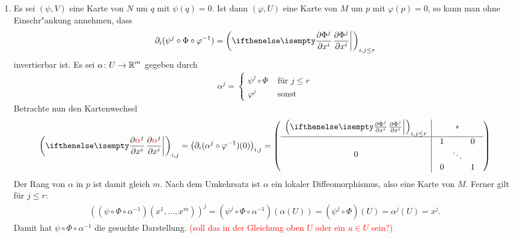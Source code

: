 
\begin{bew} %
\begin{enumerate}[label=(\roman*),widest=ii,leftmargin=*]
  \item
  Es sei $(\psi, V)$ eine Karte von $N$ um $q$ mit $\psi(q) = 0$.
  Ist dann $(\varphi, U)$ eine Karte von $M$ um $p$ mit $\varphi(p) = 0$, so kann man ohne Einschr"ankung annehmen, dass 
  \begin{align*}
    \partial_i(\psi^j \circ \Phi \circ \varphi^{-1}) = \left(\pdifffrac{\Phi^j}{x^i}\right)_{i,j \leq r} 
  \end{align*}
  invertierbar ist.
  Es sei $\alpha \colon U \to \operatorname{\mathbb{R}}^m$ gegeben durch
  \begin{align*}
    \alpha^j =
    \begin{cases}
      \psi^j \circ \Phi & \text{ für } j \leq r\\
      \varphi^j & \text{ sonst}
    \end{cases}
  \end{align*}
  Betrachte nun den Kartenwechsel
  \begin{align*}
    \left(\pdifffrac{\textcolor{red}{\alpha}^j}{x^i}\right)_{i,j} = \left(\partial_i(\alpha^j \circ \varphi^{-1})(0)\right)_{i,j} = \left(
      \begin{array}{c|c}
        \left(\pdifffrac{\Phi^j}{x^i}\right)_{i,j \le r} & \ast\\
        \hline
        0 & 
        \begin{array}{ccc}
          1 &&0\\
          &\ddots&\\
          0&&1
        \end{array}
      \end{array}\right)
  \end{align*}
  Der Rang von $\alpha$ in $p$ ist damit gleich $m$. Nach dem Umkehrsatz ist $\alpha$ ein lokaler Diffeomorphismus, also eine Karte von $M$. Ferner gilt für $j \leq r$:
  \begin{align*}
    \left((\psi \circ \Phi \circ \alpha^{-1})(x^1,\ldots,x^m)\right)^j = (\psi^j \circ \Phi \circ \alpha^{-1})(\alpha(U)) = (\psi^j\circ \Phi)(U) = \alpha^j(U) = x^j.
  \end{align*}
  Damit hat $\psi \circ \Phi \circ \alpha^{-1}$ die gesuchte Darstellung. \textcolor{red}{(soll das in der Gleichung oben $U$ oder ein $u \in U$ sein?)}


\end{enumerate}
\end{bew}
